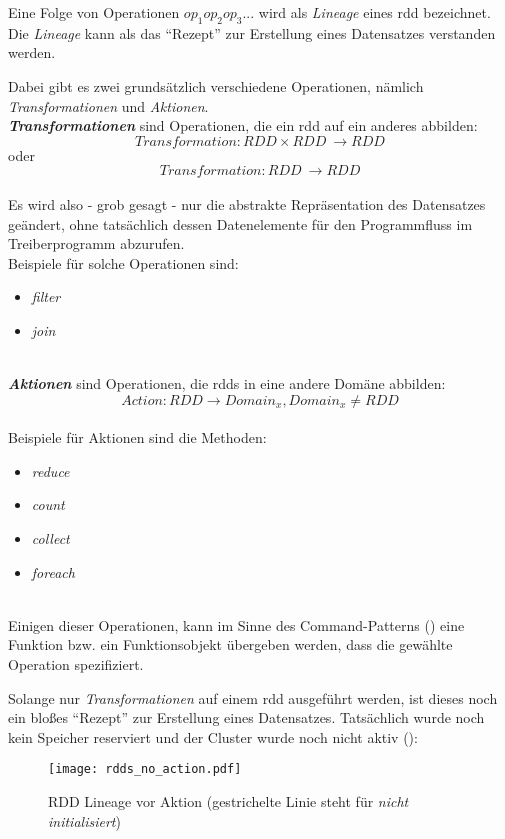 Eine Folge von Operationen $op_1op_2op_3...$ wird als \textit{Lineage} eines \gls{rdd} bezeichnet. Die \textit{Lineage} kann als das "`Rezept"' zur Erstellung eines Datensatzes verstanden werden.

Dabei gibt es zwei grundsätzlich verschiedene Operationen, nämlich \textit{Transformationen} und \textit{Aktionen}.\\

\textbf{\textit{Transformationen}} sind Operationen, die ein \gls{rdd} auf ein anderes abbilden:\\
\[Transformation: RDD \times RDD\ \longrightarrow RDD\]
oder
\[Transformation: RDD\ \longrightarrow RDD\]
\\
Es wird also - grob gesagt - nur die abstrakte Repräsentation des Datensatzes geändert, ohne tatsächlich dessen Datenelemente für den Programmfluss im Treiberprogramm abzurufen.\\
Beispiele für solche Operationen sind:
\begin{itemize}
	\item \textit{filter}
	\item \textit{join}
\end{itemize}\\

\textbf{\textit{Aktionen}} sind Operationen, die \glspl{rdd} in eine andere Domäne abbilden:\\
\[Action: RDD \longrightarrow Domain_x, Domain_x \neq RDD\]
\\
Beispiele für Aktionen sind die Methoden:
\begin{itemize}
	\item \textit{reduce}
	\item \textit{count}
	\item \textit{collect}
	\item \textit{foreach}
\end{itemize}\\

Einigen dieser Operationen, kann im Sinne des Command-Patterns (\cite{FPP13}) eine Funktion bzw. ein Funktionsobjekt übergeben werden, dass die gewählte Operation spezifiziert.

Solange nur \textit{Transformationen} auf einem \gls{rdd} ausgeführt werden, ist dieses noch ein bloßes "`Rezept"' zur Erstellung eines Datensatzes. Tatsächlich wurde noch kein Speicher reserviert und der Cluster wurde noch nicht aktiv (\cite{Mat12}):\\

\begin{figure}[ht!]
	\centering
  \texttt{[image: rdds\_no\_action.pdf]}
	\caption{RDD Lineage vor Aktion (gestrichelte Linie steht für \textit{nicht initialisiert})}
	\label{fig:rdds_no_action}
\end{figure}

